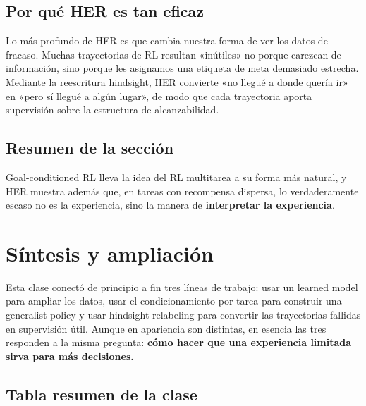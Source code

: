 \documentclass[a4paper]{article}
\begin{document}
\subsection{Por qué HER es tan eficaz}

Lo más profundo de HER es que cambia nuestra forma de ver los datos de fracaso. Muchas trayectorias de RL resultan «inútiles» no porque carezcan de información, sino porque les asignamos una etiqueta de meta demasiado estrecha. Mediante la reescritura hindsight, HER convierte «no llegué a donde quería ir» en «pero sí llegué a algún lugar», de modo que cada trayectoria aporta supervisión sobre la estructura de alcanzabilidad.

\subsection{Resumen de la sección}

Goal-conditioned RL lleva la idea del RL multitarea a su forma más natural, y HER muestra además que, en tareas con recompensa dispersa, lo verdaderamente escaso no es la experiencia, sino la manera de \textbf{interpretar la experiencia}.
\section{Síntesis y ampliación}

Esta clase conectó de principio a fin tres líneas de trabajo: usar un learned model para ampliar los datos, usar el condicionamiento por tarea para construir una generalist policy y usar hindsight relabeling para convertir las trayectorias fallidas en supervisión útil. Aunque en apariencia son distintas, en esencia las tres responden a la misma pregunta: \textbf{cómo hacer que una experiencia limitada sirva para más decisiones.}

\subsection{Tabla resumen de la clase}
\end{document}
